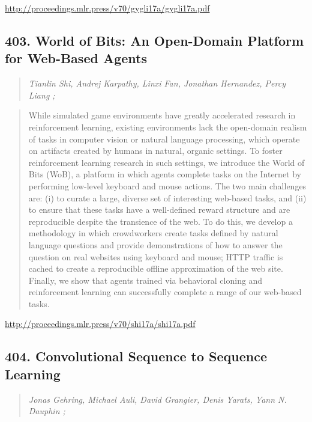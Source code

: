 \documentclass{article}
\begin{document}
\href{http://proceedings.mlr.press/v70/gygli17a/gygli17a.pdf}{http://proceedings.mlr.press/v70/gygli17a/gygli17a.pdf}

\subsection{403. World of Bits: An Open-Domain Platform for Web-Based Agents}

\begin{quote}
\footnotesize{\textit{Tianlin Shi, Andrej Karpathy, Linxi Fan, Jonathan Hernandez, Percy Liang ;}}
\end{quote}

\begin{quote}
    While simulated game environments have greatly accelerated research in reinforcement learning, existing environments lack the open-domain realism of tasks in computer vision or natural language processing, which operate on artifacts created by humans in natural, organic settings. To foster reinforcement learning research in such settings, we introduce the World of Bits (WoB), a platform in which agents complete tasks on the Internet by performing low-level keyboard and mouse actions. The two main challenges are: (i) to curate a large, diverse set of interesting web-based tasks, and (ii) to ensure that these tasks have a well-defined reward structure and are reproducible despite the transience of the web. To do this, we develop a methodology in which crowdworkers create tasks defined by natural language questions and provide demonstrations of how to answer the question on real websites using keyboard and mouse; HTTP traffic is cached to create a reproducible offline approximation of the web site. Finally, we show that agents trained via behavioral cloning and reinforcement learning can successfully complete a range of our web-based tasks.  \end{quote}

\href{http://proceedings.mlr.press/v70/shi17a/shi17a.pdf}{http://proceedings.mlr.press/v70/shi17a/shi17a.pdf}

\subsection{404. Convolutional Sequence to Sequence Learning}

\begin{quote}
\footnotesize{\textit{Jonas Gehring, Michael Auli, David Grangier, Denis Yarats, Yann N. Dauphin ;}}
\end{quote}
\end{document}
